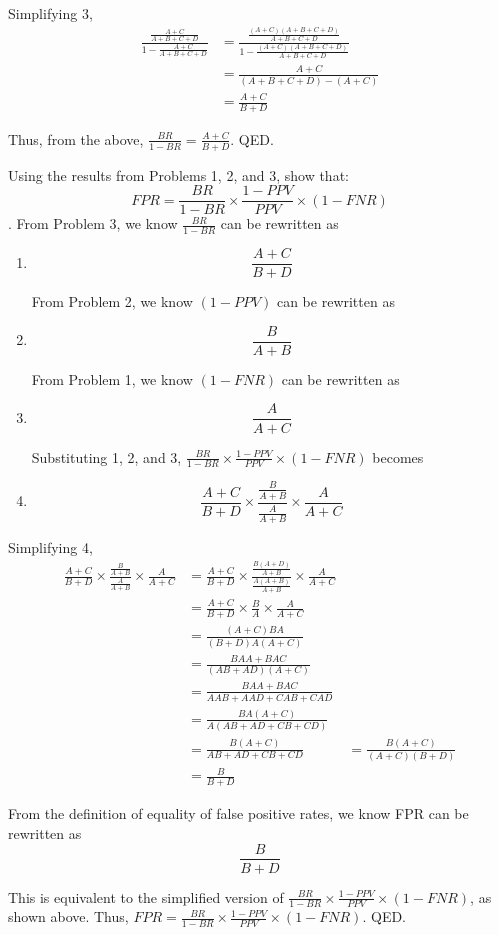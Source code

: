 \documentclass{cisXXX} %
\begin{document}
Simplifying 3,
\begin{align*}
\frac{\frac{A+C}{A+B+C+D}}{1-\frac{A+C}{A+B+C+D}} &= \frac{\frac{(A+C)(A+B+C+D)}{A+B+C+D}}{1-\frac{(A+C)(A+B+C+D)}{A+B+C+D}}\\
&= \frac{A+C}{(A+B+C+D) - (A+C)}\\
&= \frac{A+C}{B+D}
\end{align*}

Thus, from the above, $\frac{BR}{1-BR} = \frac{A+C}{B+D}$. QED.

\HWproblem
Using the results from Problems 1, 2, and 3, show that:
$$FPR = \frac{BR}{1-BR}\times\frac{1-PPV}{PPV}\times(1 -FNR)$$
.
From Problem 3, we know $\frac{BR}{1-BR}$ can be rewritten as
\begin{enumerate}
\item $$\frac{A+C}{B+D}$$

From Problem 2, we know $(1-PPV)$ can be rewritten as
\item $$\frac{B}{A+B}$$

From Problem 1, we know $(1-FNR)$ can be rewritten as
\item $$\frac{A}{A+C}$$

Substituting 1, 2, and 3, $\frac{BR}{1-BR}\times\frac{1-PPV}{PPV}\times(1 -FNR)$ becomes
\item $$\frac{A+C}{B+D}\times\frac{\frac{B}{A+B}}{\frac{A}{A+B}}\times\frac{A}{A+C}$$
\end{enumerate}

Simplifying 4,
\begin{align*}
\frac{A+C}{B+D}\times\frac{\frac{B}{A+B}}{\frac{A}{A+B}}\times\frac{A}{A+C} &= \frac{A+C}{B+D}\times\frac{\frac{B(A+D)}{A+B}}{\frac{A(A+B)}{A+B}}\times\frac{A}{A+C}\\
&= \frac{A+C}{B+D}\times\frac{B}{A}\times\frac{A}{A+C}\\
&= \frac{(A+C)BA}{(B+D)A(A+C)}\\
&= \frac{BAA+BAC}{(AB+AD)(A+C)}\\
&= \frac{BAA+BAC}{AAB+AAD+CAB+CAD}\\
&= \frac{BA(A+C)}{A(AB+AD+CB+CD)}\\
&= \frac{B(A+C)}{AB+AD+CB+CD}
&= \frac{B(A+C)}{(A+C)(B+D)}\\
&= \frac{B}{B+D}
\end{align*}

From the definition of equality of false positive rates, we know FPR can be rewritten as
$$\frac{B}{B+D}$$

This is equivalent to the simplified version of $\frac{BR}{1-BR}\times\frac{1-PPV}{PPV}\times(1 -FNR)$, as shown above. Thus, $FPR = \frac{BR}{1-BR}\times\frac{1-PPV}{PPV}\times(1 -FNR)$. QED.
\end{document}
